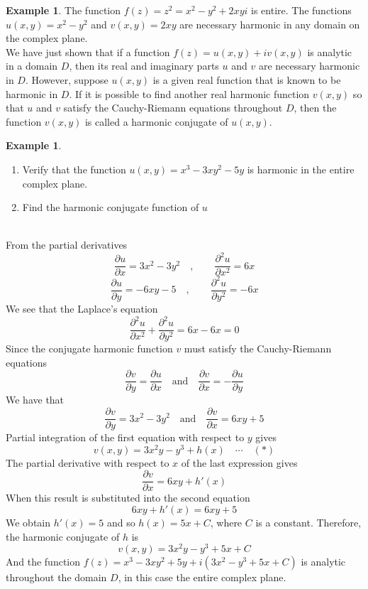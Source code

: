 \documentclass[11pt,a4paper]{article}
\theoremstyle{definition}
\newtheorem{example}[thm]{Example}
\begin{document}
\begin{example}
The function $f(z) = z^2 = x^2 - y^2 + 2xy i$ is entire. The functions $u(x,y) = x^2 - y^2$ and $v(x,y) = 2xy$ are necessary harmonic in any domain on the complex plane.\\



We have just shown that if a function $f(z) = u(x,y) + iv(x,y)$ is analytic in a domain $D$, then its real and imaginary parts $u$ and $v$ are necessary harmonic in $D$. However, suppose $u(x,y)$ is a given real function that is known to be harmonic in $D$. If it is possible to find another real harmonic function $v(x,y)$ so that $u$  and $v$ satisfy the Cauchy-Riemann equations throughout $D$, then the function $v(x,y)$ is called a  harmonic conjugate of $u(x,y)$.
\end{example}

\begin{example}
\begin{enumerate}
\item Verify that the function $u(x,y)  = x^3  - 3xy^2 - 5y$ is harmonic in the entire complex plane.
\item Find the harmonic conjugate function of $u$\\
\end{enumerate}




\text{\textcolor{red}{Solution}}\\
From the partial derivatives 
$$\frac{\partial u}{\partial x} = 3x^2 - 3y^2\quad , \qquad  \frac{\partial^2u}{\partial x^2} = 6x$$
$$\frac{\partial u}{\partial y} = -6xy  - 5\quad ,\qquad \frac{\partial^2u}{\partial y^2} = -6x$$
We see that the Laplace's equation $$\frac{\partial^2u}{\partial x^2} + \frac{\partial^2u}{\partial y^2} = 6x - 6x = 0$$
Since the conjugate harmonic function $v$ must satisfy the Cauchy-Riemann equations
$$\frac{\partial v}{\partial y} = \frac{\partial u}{\partial x}\quad \text{and}\quad \frac{\partial v}{\partial x} = -\frac{\partial u}{\partial y}$$
We have that $$\frac{\partial v}{\partial y} = 3x^2 -3y^2\quad \text{and}\quad \frac{\partial v}{\partial x}= 6xy + 5$$
Partial integration of the first equation with respect to $y$ gives $$v(x,y) = 3x^2y - y^3 + h(x)\quad \cdots\quad (*)$$
The partial derivative with respect to $x$ of the last expression gives
$$\frac{\partial v}{\partial x} = 6xy + h'(x)$$
When this result is substituted into the second equation $$6xy + h'(x) = 6xy + 5$$
We obtain $h'(x) = 5$ and so $h(x) = 5x + C$, where $C$ is a constant. Therefore, the harmonic conjugate of $h$ is 
$$v(x,y) = 3x^2y - y^3 + 5x + C$$ And the function $f(z) = x^3 - 3xy^2 + 5y + i (3x^2 - y^3 + 5x + C)$ is analytic throughout the domain $D$, in this case the entire complex plane.\\\\
\end{example}
\end{document}

